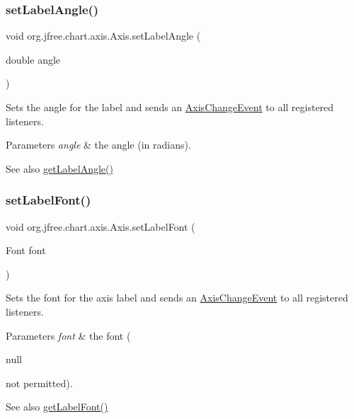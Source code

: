 \subsubsection{\texorpdfstring{set\+Label\+Angle()}{setLabelAngle()}}
{\footnotesize\ttfamily void org.\+jfree.\+chart.\+axis.\+Axis.\+set\+Label\+Angle (\begin{DoxyParamCaption}\item[{double}]{angle }\end{DoxyParamCaption})}

Sets the angle for the label and sends an \mbox{\hyperlink{}{Axis\+Change\+Event}} to all registered listeners.


\begin{DoxyParams}{Parameters}
{\em angle} & the angle (in radians).\\
\hline
\end{DoxyParams}
\begin{DoxySeeAlso}{See also}
\mbox{\hyperlink{classorg_1_1jfree_1_1chart_1_1axis_1_1_axis_a51cf668dba1c051f7c59e82668618f33}{get\+Label\+Angle()}} 
\end{DoxySeeAlso}
\mbox{\label{classorg_1_1jfree_1_1chart_1_1axis_1_1_axis_a9fe56f9cd8d81dc5a0b96b70ab0c8643}} 
\subsubsection{\texorpdfstring{set\+Label\+Font()}{setLabelFont()}}
{\footnotesize\ttfamily void org.\+jfree.\+chart.\+axis.\+Axis.\+set\+Label\+Font (\begin{DoxyParamCaption}\item[{Font}]{font }\end{DoxyParamCaption})}

Sets the font for the axis label and sends an \mbox{\hyperlink{}{Axis\+Change\+Event}} to all registered listeners.


\begin{DoxyParams}{Parameters}
{\em font} & the font (
\begin{DoxyCode}
null 
\end{DoxyCode}
 not permitted).\\
\hline
\end{DoxyParams}
\begin{DoxySeeAlso}{See also}
\mbox{\hyperlink{classorg_1_1jfree_1_1chart_1_1axis_1_1_axis_a8aa271547c74cba1a28e26068828ef0e}{get\+Label\+Font()}} 
\end{DoxySeeAlso}
\mbox{\label{classorg_1_1jfree_1_1chart_1_1axis_1_1_axis_a970b20fba1da1a2de290f24306f12995}} 
